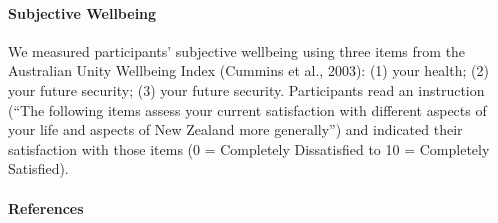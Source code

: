 \documentclass[
  letterpaper,
  DIV=11,
  numbers=noendperiod]{scrartcl}
\let\oldparagraph\paragraph
\renewcommand{\paragraph}[1]{\oldparagraph{#1}\mbox{}}
\begin{document}
\hypertarget{subjective-wellbeing}{%
\paragraph{Subjective Wellbeing}\label{subjective-wellbeing}}

We measured participants' subjective wellbeing using three items from
the Australian Unity Wellbeing Index (Cummins et al., 2003): (1) your
health; (2) your future security; (3) your future security. Participants
read an instruction (``The following items assess your current
satisfaction with different aspects of your life and aspects of New
Zealand more generally'') and indicated their satisfaction with those
items (0 = Completely Dissatisfied to 10 = Completely Satisfied).

\pagebreak

\hypertarget{references}{%
\paragraph{References}\label{references}}
\end{document}
